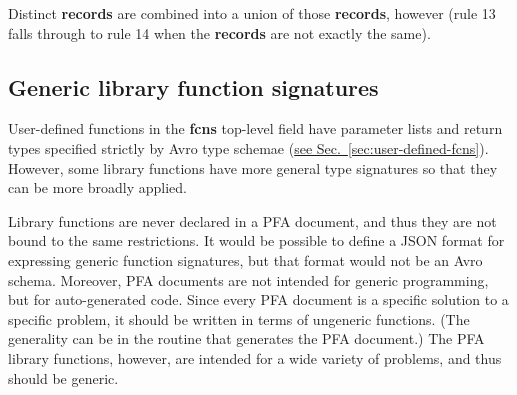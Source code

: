 \documentclass{article}
\newcommand{\PFAc}{\ttfamily\bfseries}
\theoremstyle{definition}
\begin{document}
Distinct {\bf records} are combined into a union of those {\bf records}, however (rule 13 falls through to rule 14 when the {\bf records} are not exactly the same).

\hypertarget{hsec:generic-signatures}{}
\subsection{Generic library function signatures}
\label{sec:generic-signatures}

User-defined functions in the {\PFAc fcns} top-level field have parameter lists and return types specified strictly by Avro type schemae (\hyperlink{hsec:user-defined-fcns}{see Sec.~\ref{sec:user-defined-fcns}}).  However, some library functions have more general type signatures so that they can be more broadly applied.

Library functions are never declared in a PFA document, and thus they are not bound to the same restrictions.  It would be possible to define a JSON format for expressing generic function signatures, but that format would not be an Avro schema.  Moreover, PFA documents are not intended for generic programming, but for auto-generated code.  Since every PFA document is a specific solution to a specific problem, it should be written in terms of ungeneric functions.  (The generality can be in the routine that generates the PFA document.)  The PFA library functions, however, are intended for a wide variety of problems, and thus should be generic.
\end{document}
